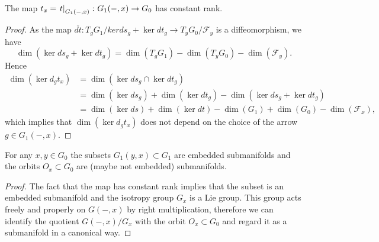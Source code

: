 \begin{prop}
The map $t_x = \left.t\right|_{G_1(-,x)}\colon G_1(-,x)\to G_0$ has constant rank.
\end{prop}

\begin{proof}
As the map $\overline{dt}\colon T_gG_1 / ker ds_g + \ker dt_g \to T_yG_0 / \mathcal{F}_y$ is a diffeomorphism, we have
\begin{equation}
\dim(\ker ds_g + \ker dt_g) = \dim(T_gG_1) - \dim(T_yG_0) - \dim(\mathcal{F}_y) \text{.}
\end{equation}
Hence
\begin{align}
\dim(\ker d_gt_x) &= \dim(\ker ds_g \cap \ker dt_g) \\
 &= \dim(\ker ds_g) + \dim(\ker dt_g) - \dim(\ker ds_g + \ker dt_g) \\
 &= \dim(\ker ds) + \dim(\ker dt) - \dim(G_1) + \dim(G_0) - \dim(\mathcal{F}_x) \text{,}
\end{align}
which implies that $\dim(\ker d_gt_x)$ does not depend on the choice of the arrow $g\in G_1(-,x)$.
\end{proof}

\begin{thm}
For any $x,y \in G_0$ the subsets $G_1(y,x) \subset G_1$ are embedded submanifolds and the orbits $O_x \subset G_0$ are (maybe not embedded) submanifolds.
\end{thm}

\begin{proof}
The fact that the map  has constant rank implies that the subset  is an embedded submanifold and the isotropy group $G_x$ is a Lie group.
This group acts freely and properly on $G(-,x)$ by right multiplication, therefore we can identify the quotient $G(-,x)/G_x$ with the orbit $O_x\subset G_0$ and regard it as a submanifold in a canonical way.
\end{proof}
